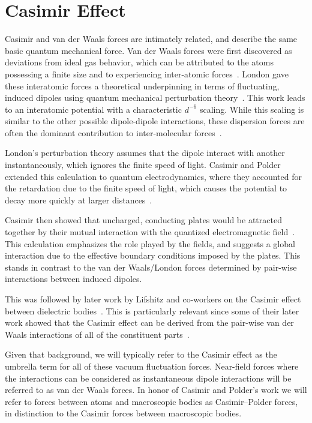 \section{Casimir Effect}
\label{sec:casimir}
Casimir and van der Waals forces are intimately related, and describe the same basic quantum mechanical force. 
Van der Waals forces were first discovered as deviations from ideal gas behavior, which can be attributed 
to the atoms possessing a finite size and to experiencing inter-atomic forces~\cite{vanderWaals,Parsegian2006}.
London gave these interatomic forces a theoretical underpinning in terms of fluctuating, induced dipoles using quantum mechanical perturbation
 theory~\cite{London1930}.
  This work leads to an interatomic potential with a characteristic $d^{-6}$ scaling.
While this scaling is similar to the other possible dipole-dipole interactions, these dispersion forces are often the dominant contribution
to inter-molecular forces~\cite{Israelachvili2011}.

London's perturbation theory assumes that the dipole interact with another instantaneously, which
ignores the finite speed of light.  Casimir and Polder extended this calculation to quantum electrodynamics,
where they accounted for the retardation due to the finite speed of light, 
which causes the potential to decay more quickly at larger distances~\cite{CasimirPolder1948}.  

Casimir then showed that uncharged, conducting plates would be attracted together by their mutual
interaction with the quantized electromagnetic field~\cite{Casimir1948}.
This calculation emphasizes the role played by the fields, and suggests
a global interaction due to the effective boundary conditions imposed by the plates.  This
stands in contrast to the van der Waals/London forces determined by pair-wise interactions between induced dipoles.

This was followed by later work by Lifshitz and co-workers on the Casimir effect between dielectric bodies~\cite{Lifshitz1956}.
This is particularly relevant since some of their later work showed that the Casimir effect can be derived 
from the pair-wise van der Waals interactions of all of the constituent parts~\cite{Dzyaloshinskii1961}.  

Given that background, we will typically refer to the Casimir effect as the umbrella term for all of these
vacuum fluctuation forces.  Near-field forces where the interactions can be considered as instantaneous
dipole interactions will be referred to as van der Waals forces.  In honor of Casimir and Polder's work
we will refer to forces between atoms and macroscopic bodies as Casimir--Polder forces, in distinction to the Casimir 
forces between macroscopic bodies.    

